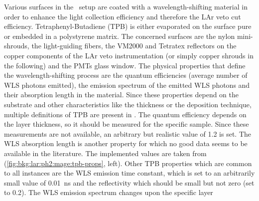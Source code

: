 Various surfaces in the \gerda\ setup are coated with a wavelength-shifting material in
order to enhance the light collection efficiency and therefore the LAr veto cut
efficiency. Tetraphenyl-Butadiene (TPB) is either evaporated on the surface pure or
embedded in a polystyrene matrix. The concerned surfaces are the nylon mini-shrouds, the
light-guiding fibers, the VM2000 and Tetratex\reg{} reflectors on the copper components of
the LAr veto instrumentation (or simply copper shrouds in the following) and the PMTs
glass window. The physical properties that define the wavelength-shifting process are the
quantum efficiencies (average number of WLS photons emitted), the emission spectrum of the
emitted WLS photons and their absorption length in the material. Since these properties
depend on the substrate and other characteristics like the thickness or the deposition
technique, multiple definitions of TPB are present in \mage. The quantum efficiency
depends on the layer thickness, so it should be measured for the specific sample. Since
these measurements are not available, an arbitrary but realistic value of 1.2 is set. The
WLS absorption length is another property for which no good data seems to be available in
the literature. The implemented values are taken from~\cite{Benson2017}
(\cref{fig:bkg:lar:ph2:mage:tpb-props}, left). Other TPB properties which are common to
all instances are the WLS emission time constant, which is set to an arbitrarily small
value of 0.01~ns and the reflectivity which should be small but not zero (set to 0.2).
The WLS emission spectrum changes upon the specific layer

